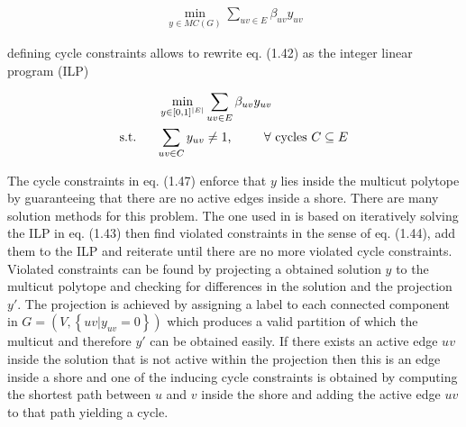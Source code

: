 \begin{align}
	\min_{y \in MC(G)} \sum_{uv \in E} \beta_{uv} y_{uv}
\end{align}

defining cycle constraints allows to rewrite eq. (1.42) as the integer linear program (ILP)

\begin{align}
	\min_{y \in [0, 1]^{|E|}} & \sum_{uv \in E} \beta_{uv} y_{uv} \\
	 \text{s.t. \hspace{4mm}} \sum_{uv \in C} y_{uv} & \neq 1 \text{, \hspace{8mm}} \forall \text{ cycles } C \subseteq E 
\end{align}

The cycle constraints in eq. (1.47) enforce that $y$ lies inside the multicut polytope by guaranteeing that there are no active edges inside a shore. There are many solution methods for this problem. The one used in \cite{10.1007/978-3-642-23094-3_3} is based on iteratively solving the ILP in eq. (1.43) then find violated constraints in the sense of eq. (1.44), add them to the ILP and reiterate until there are no more violated cycle constraints.\\
Violated constraints can be found by projecting a obtained solution $y$ to the multicut polytope and checking for differences in the solution and the projection $y'$.
The projection is achieved by assigning a label to each connected component in $G=(V, \left\{ uv | y_{uv} = 0 \right\})$ which produces a valid partition of which the multicut and therefore $y'$ can be obtained easily. If there exists an active edge $uv$ inside the solution that is not active within the projection then this is an edge inside a shore and one of the inducing cycle constraints is obtained by computing the shortest path between $u$ and $v$ inside the shore and adding the active edge $uv$ to that path yielding a cycle.
